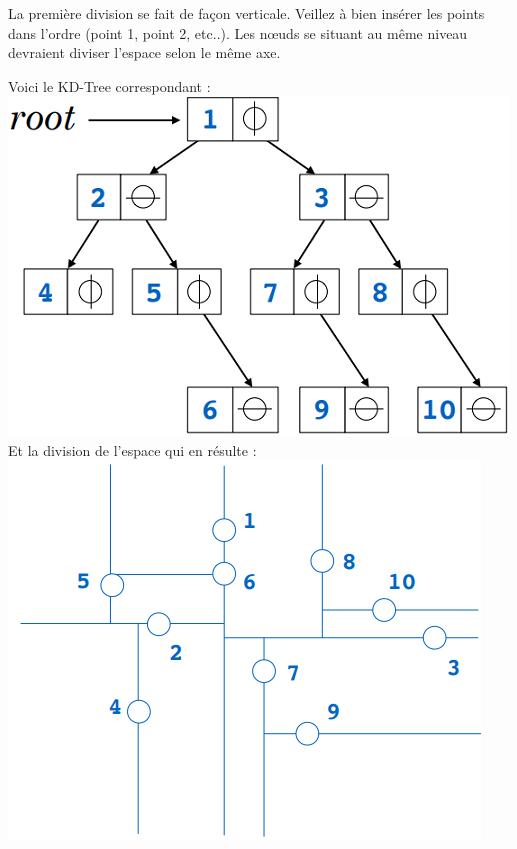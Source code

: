 \begin{Exercice}[5 minutes]
\begin{conseil}
La première division se fait de façon verticale. Veillez à bien insérer les points dans l'ordre (point 1, point 2, etc..). Les nœuds se situant au même niveau devraient diviser l'espace selon le même axe.
\end{conseil}
\begin{solution}
    Voici le KD-Tree correspondant :\\
    \includegraphics[]{resources/Kd-tree.PNG}\\
    Et la division de l'espace qui en résulte :\\
    \includegraphics[]{resources/Division espace.PNG}
\end{solution}
\end{Exercice}

